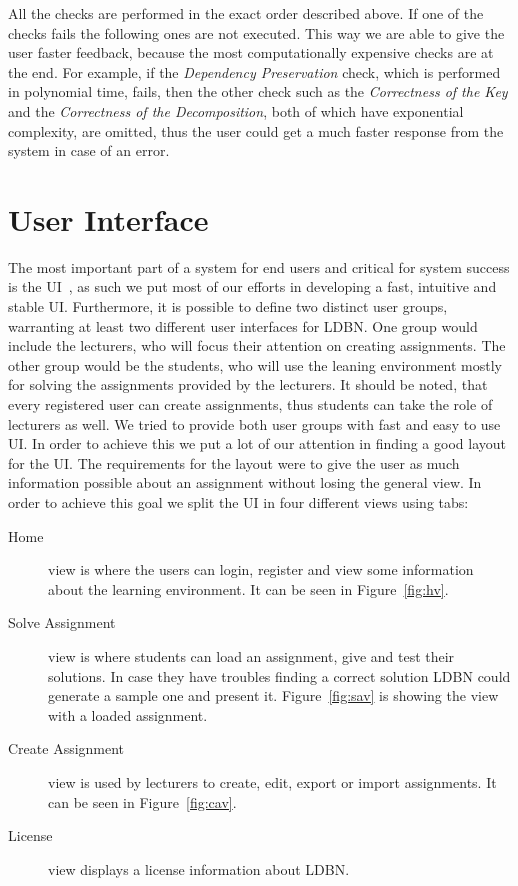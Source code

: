 All the checks are performed in the exact order described above. If one of the checks fails the following ones
are not executed. This way we are able to give the user faster feedback, because 
the most computationally expensive checks are at the end. For example, if the \textit{Dependency Preservation}
check, which is performed in polynomial time, fails, then the other check such as the 
\textit{Correctness of the Key} and the \textit{Correctness of the Decomposition}, both of which 
have exponential complexity, are omitted, thus the user could get a much faster response from the system
in case of an error. 

\section{User Interface}
The most important part of a system for end users and critical for system 
success is the UI~\cite{p9}, as such we put most of
our efforts in developing a fast, intuitive and stable UI. Furthermore,
it is possible to define two distinct user groups, warranting at least two different
user interfaces for LDBN.  One group would include the lecturers, who will
focus their attention on creating assignments. The other group would be the 
students, who will use the leaning environment mostly for solving 
the assignments provided by the lecturers. It should be noted, that every registered
user can create assignments, thus students can take the role of lecturers as well.
We tried to provide both 
user groups with fast and easy to use UI. In order to achieve this we put a lot
of our attention in finding a good layout for the UI. The requirements for
the layout were to give the user as much information possible about an 
assignment without losing the general view. In order to achieve this goal  
we split the UI in four different views using tabs:

\begin{description}
	\item[Home] view is where the users can login, register and view some information 
	about the learning environment. It can be seen in Figure~\ref{fig:hv}.
	\item[Solve Assignment] view is where students can load an assignment, give and
	test their solutions. In case they have troubles finding a correct solution
	LDBN could generate a sample one and present it. Figure~\ref{fig:sav} is showing
	the view with a loaded assignment.
	\item[Create Assignment] view is used by lecturers to create, edit, export or import
	assignments. It can be seen in Figure~\ref{fig:cav}.
	\item[License] view displays a license information about LDBN.
\end{description} 

